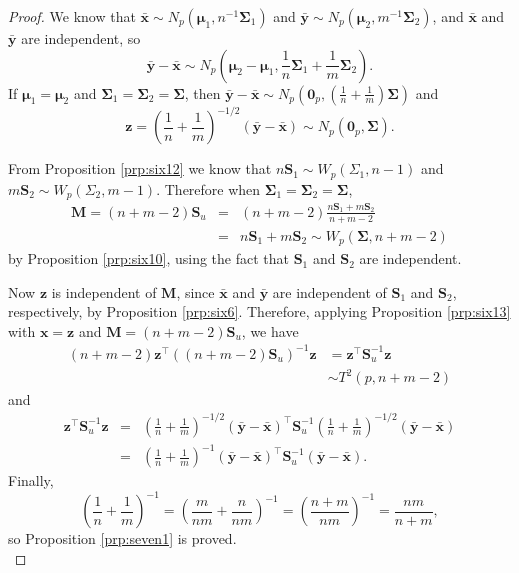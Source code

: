 \documentclass[]{book}
\theoremstyle{definition}
\theoremstyle{definition}
\theoremstyle{definition}
\theoremstyle{remark}
\begin{document}
\begin{proof}
{}We know that \(\bar{\boldsymbol x} \sim N_p \left(\boldsymbol \mu_1,n^{-1}\boldsymbol \Sigma_1 \right)\) and \(\bar{\boldsymbol y} \sim N_p \left(\boldsymbol \mu_2,m^{-1}\boldsymbol \Sigma_2 \right)\), and \(\bar{\boldsymbol x}\) and \(\bar{\boldsymbol y}\) are independent, so
\[\bar{\boldsymbol y} - \bar{\boldsymbol x} \sim N_p \left(\boldsymbol \mu_2 - \boldsymbol \mu_1, \frac{1}{n}\boldsymbol \Sigma_1 + \frac{1}{m} \boldsymbol \Sigma_2 \right).\]
If \(\boldsymbol \mu_1 = \boldsymbol \mu_2\) and \(\boldsymbol \Sigma_1 = \boldsymbol \Sigma_2 = \boldsymbol \Sigma\), then \(\bar{\boldsymbol y} - \bar{\boldsymbol x} \sim N_p \left(\boldsymbol 0_p, \left(\frac{1}{n} + \frac{1}{m} \right)\boldsymbol \Sigma\right)\) and
\[\boldsymbol z= \left(\frac{1}{n} + \frac{1}{m} \right)^{-1/2} (\bar{\boldsymbol y} - \bar{\boldsymbol x}) \sim N_p(\boldsymbol 0_p,\boldsymbol \Sigma).\]

From Proposition \ref{prp:six12} we know that \(n\boldsymbol S_1 \sim W_p(\Sigma_1,n-1)\) and \(m\boldsymbol S_2 \sim W_p(\Sigma_2,m-1)\). Therefore when \(\boldsymbol \Sigma_1 = \boldsymbol \Sigma_2 = \boldsymbol \Sigma\),
\begin{eqnarray*}
\boldsymbol M= (n+m-2)\boldsymbol S_u &=& (n+m-2)\frac{n\boldsymbol S_1 + m\boldsymbol S_2}{n+m-2} \\
&=& n\boldsymbol S_1 + m\boldsymbol S_2 \sim W_p(\boldsymbol \Sigma,n+m-2)
\end{eqnarray*}
by Proposition \ref{prp:six10}, using the fact that \(\boldsymbol S_1\) and \(\boldsymbol S_2\) are independent.

Now \(\boldsymbol z\) is independent of \(\boldsymbol M\), since \(\bar{\boldsymbol x}\) and \(\bar{\boldsymbol y}\) are independent of \(\boldsymbol S_1\) and \(\boldsymbol S_2\), respectively, by Proposition \ref{prp:six6}. Therefore, applying Proposition \ref{prp:six13} with \(\boldsymbol x= \boldsymbol z\) and \(\boldsymbol M= (n+m-2)\boldsymbol S_u\), we have
\begin{align*}
(n+m-2) \boldsymbol z^\top ((n+m-2)\boldsymbol S_u)^{-1} \boldsymbol z&= \boldsymbol z^\top \boldsymbol S_u^{-1} \boldsymbol z\\
&\sim T^2(p,n+m-2)
\end{align*}
and
\begin{eqnarray*}
\boldsymbol z^\top \boldsymbol S_u^{-1} \boldsymbol z&=& \left(\frac{1}{n} + \frac{1}{m} \right)^{-1/2} (\bar{\boldsymbol y} - \bar{\boldsymbol x})^\top \boldsymbol S_u^{-1} \left(\frac{1}{n} + \frac{1}{m} \right)^{-1/2} (\bar{\boldsymbol y} - \bar{\boldsymbol x}) \\
&=& \left(\frac{1}{n} + \frac{1}{m} \right)^{-1} (\bar{\boldsymbol y} - \bar{\boldsymbol x})^\top \boldsymbol S_u^{-1} (\bar{\boldsymbol y} - \bar{\boldsymbol x}).
\end{eqnarray*}
Finally,
\[\left(\frac{1}{n} + \frac{1}{m} \right)^{-1} = \left(\frac{m}{nm} + \frac{n}{nm} \right)^{-1} = \left(\frac{n+m}{nm} \right)^{-1} = \frac{nm}{n+m},\]
so Proposition \ref{prp:seven1} is proved.\\
\end{proof}
\end{document}
